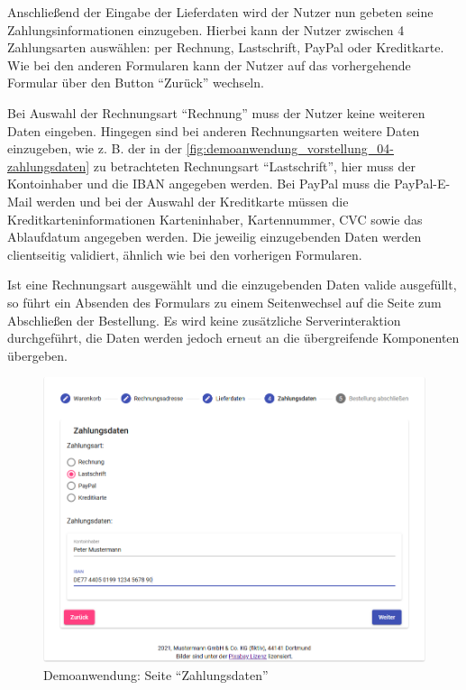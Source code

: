 Anschließend der Eingabe der Lieferdaten wird der Nutzer nun gebeten seine Zahlungsinformationen einzugeben. Hierbei kann der Nutzer zwischen 4 Zahlungsarten auswählen: per Rechnung, Lastschrift, PayPal oder Kreditkarte. Wie bei den anderen Formularen kann der Nutzer auf das vorhergehende Formular über den Button \enquote{Zurück} wechseln.

Bei Auswahl der Rechnungsart \enquote{Rechnung} muss der Nutzer keine weiteren Daten eingeben. Hingegen sind bei anderen Rechnungsarten weitere Daten einzugeben, wie z. B. der in der \autoref{fig:demoanwendung_vorstellung_04-zahlungsdaten} zu betrachteten Rechnungsart \enquote{Lastschrift}, hier muss der Kontoinhaber und die IBAN angegeben werden. Bei PayPal muss die PayPal-E-Mail werden und bei der Auswahl der Kreditkarte müssen die Kreditkarteninformationen Karteninhaber, Kartennummer, CVC sowie das Ablaufdatum angegeben werden. Die jeweilig einzugebenden Daten werden clientseitig validiert, ähnlich wie bei den vorherigen Formularen.

Ist eine Rechnungsart ausgewählt und die einzugebenden Daten valide ausgefüllt, so führt ein Absenden des Formulars zu einem Seitenwechsel auf die Seite zum Abschließen der Bestellung. Es wird keine zusätzliche Serverinteraktion durchgeführt, die Daten werden jedoch erneut an die übergreifende Komponenten übergeben.

\begin{figure}[H]
	\centering
	\includegraphics[width=0.90\linewidth]{img/04_erstellung-poc/demoanwendung_vorstellung_04-zahlungsdaten.png}
	\caption{Demoanwendung: Seite \enquote{Zahlungsdaten}}
	\label{fig:demoanwendung_vorstellung_04-zahlungsdaten}
\end{figure}

